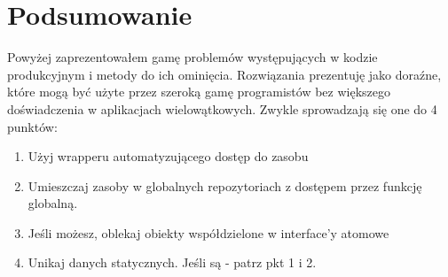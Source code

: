 \section{Podsumowanie}
Powyżej zaprezentowałem gamę problemów występujących w kodzie produkcyjnym i metody do ich ominięcia. Rozwiązania prezentuję jako doraźne, które mogą być użyte przez szeroką gamę programistów bez większego doświadczenia w aplikacjach wielowątkowych. Zwykle sprowadzają się one do 4 punktów:
\begin{enumerate}
\item Użyj wrapperu  automatyzującego dostęp do zasobu
\item Umieszczaj zasoby w globalnych repozytoriach z dostępem przez funkcję globalną.
\item Jeśli możesz, oblekaj obiekty współdzielone w interface'y atomowe
\item Unikaj danych statycznych. Jeśli są - patrz pkt 1 i 2.
\end{enumerate}

